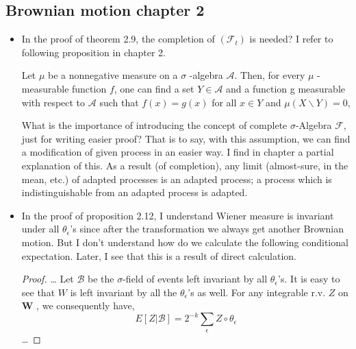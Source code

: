 \subsection{Brownian motion chapter 2}
\begin{itemize}
	\item
	In the proof of theorem 2.9, the completion of $ (\mathscr{F}_t) $ is needed? I refer to following proposition \cite{bogachev2007measure} in
	chapter 2.
	\begin{proposition}[2.1.11. Proposition]
		Let $\mu$ be a nonnegative measure on a $\sigma$ -algebra $\mathcal{A}$. Then, for every $\mu$ -measurable function $f$, one can find a set $Y \in \mathcal{A}$ and a function g measurable with respect to $\mathcal{A}$ such that $f(x)=g(x)$ for all $x \in Y$ and $\mu(X \backslash Y)=0$, 
	\end{proposition}
 What is the importance of introducing the concept of complete $ \sigma$-Algebra $\mathscr{F} $, just for writing easier proof? That is to say, with this assumption, we can find a modification of given process in an easier way.
 I find in chapter a partial explanation of this. As a result (of completion), any limit (almost-sure, in the mean, etc.) of adapted processes is an adapted process; a process which is indistinguishable from an adapted process is adapted.
 
 \item In the proof of proposition 2.12, I understand Wiener measure is invariant under all $ \theta_\epsilon $'s since after the transformation we always get another Brownian motion. But I don't understand how do we calculate the following conditional expectation. Later, I see that this is a result of direct calculation.
 \begin{proof}
 	\ldots 
 	Let $ \mathscr{B} $ be the $ \sigma $-field of events left invariant by all $ \theta_\epsilon $'s. It is easy to see that
 	$ W $ is left invariant by all the $ \theta_\epsilon $'s as well. For any integrable r.v. $ Z  $ on \textbf{W} , we
 	consequently have,
 	\[ E[Z|\mathscr{B}]=2^{-k}\sum_\epsilon Z\circ \theta_\epsilon \]
 	\ldots
 \end{proof}

\end{itemize}
